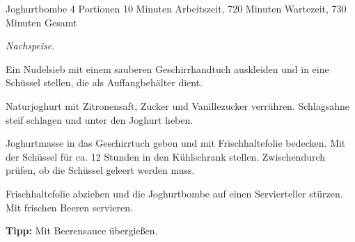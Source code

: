 \begin{recipe}{Joghurtbombe} {4 Portionen} {10 Minuten Arbeitszeit, 720 Minuten Wartezeit, 730 Minuten Gesamt}

  \freeform{}\textit{Nachspeise.}


  Ein Nudelsieb mit einem sauberen Geschirrhandtuch auskleiden und in eine Schüssel stellen, die als Auffangbehälter dient.

  \newstep{}Naturjoghurt mit Zitronensaft, Zucker und Vanillezucker verrühren.
  Schlagsahne steif schlagen und unter den Joghurt heben.

  \newstep{}Joghurtmasse in das Geschirrtuch geben und mit Frischhaltefolie bedecken.
  Mit der Schüssel für ca. 12 Stunden in den Kühlschrank stellen.
  Zwischendurch prüfen, ob die Schüssel geleert werden muss.

  \newstep{}Frischhaltefolie abziehen und die Joghurtbombe auf einen Servierteller stürzen.
  Mit frischen Beeren servieren.

  \freeform{}\hrulefill{}

  \freeform{}\textbf{Tipp:}
  Mit Beerensauce übergießen.

\end{recipe}
